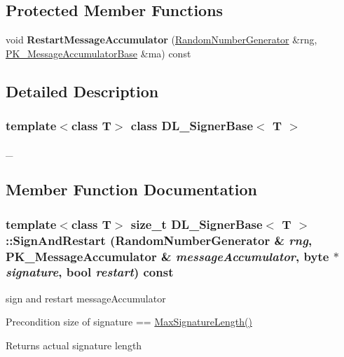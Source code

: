 \subsection*{Protected Member Functions}
\begin{DoxyCompactItemize}
\item 
\hypertarget{class_d_l___signer_base_ada3201914424fef2e0e9ed697cc160e5}{
void {\bfseries RestartMessageAccumulator} (\hyperlink{class_random_number_generator}{RandomNumberGenerator} \&rng, \hyperlink{class_p_k___message_accumulator_base}{PK\_\-MessageAccumulatorBase} \&ma) const }
\label{class_d_l___signer_base_ada3201914424fef2e0e9ed697cc160e5}

\end{DoxyCompactItemize}


\subsection{Detailed Description}
\subsubsection*{template$<$class T$>$ class DL\_\-SignerBase$<$ T $>$}

\_\- 

\subsection{Member Function Documentation}
\hypertarget{class_d_l___signer_base_a1c0d9588fc5a340a14342c474b2a52e2}{
\subsubsection[{SignAndRestart}]{\setlength{\rightskip}{0pt plus 5cm}template$<$class T$>$ size\_\-t {\bf DL\_\-SignerBase}$<$ T $>$::SignAndRestart ({\bf RandomNumberGenerator} \& {\em rng}, \/  {\bf PK\_\-MessageAccumulator} \& {\em messageAccumulator}, \/  byte $\ast$ {\em signature}, \/  bool {\em restart}) const}}
\label{class_d_l___signer_base_a1c0d9588fc5a340a14342c474b2a52e2}


sign and restart messageAccumulator \begin{DoxyPrecond}{Precondition}
size of signature == \hyperlink{class_p_k___signature_scheme_af04668d211a923ba03f2721c220272e9}{MaxSignatureLength()} 
\end{DoxyPrecond}
\begin{DoxyReturn}{Returns}
actual signature length 
\end{DoxyReturn}


